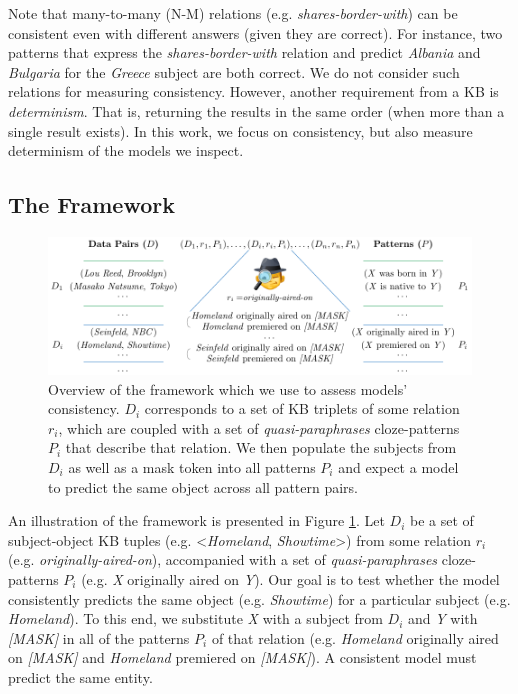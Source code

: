 Note that many-to-many (N-M) relations (e.g. \textit{shares-border-with}) can be consistent 
even with different answers (given they are correct). For instance, two patterns that express the \textit{shares-border-with} relation and predict \textit{Albania} and \textit{Bulgaria} for the \textit{Greece} subject are both correct. We do not consider such relations for measuring consistency. However, another requirement from a KB is \textit{determinism}. That is, returning the results in the same order (when more than a single result exists).
In this work, we focus on consistency, but also measure determinism of the models we inspect.

\subsection{The Framework}
\label{sec:framework}

\begin{figure}[t!]
\centering

\includegraphics[width=1.\columnwidth]{figures/framework}

\caption{Overview of the framework which we use to assess models' consistency. $D_i$ corresponds to a set of KB triplets of some relation $r_i$, which are coupled with a set of \textit{quasi-paraphrases} cloze-patterns $P_i$ that describe that relation. We then populate the subjects from $D_i$ as well as a mask token into all patterns $P_i$ and expect a model to predict the same object across all pattern pairs.}
\label{fig:framework}
\end{figure}



An illustration of the framework is presented in Figure \ref{fig:framework}.
Let $D_i$ be a set of subject-object KB tuples (e.g. <\textit{Homeland}, \textit{Showtime}>) from some relation $r_i$ (e.g. \textit{originally-aired-on}), accompanied with a set of \textit{quasi-paraphrases} cloze-patterns $P_i$ (e.g. \textit{X} originally aired on \textit{Y}).
Our goal is to test whether the model consistently predicts the same object (e.g. \textit{Showtime}) for a particular subject (e.g. \textit{Homeland}). To this end, we substitute \textit{X} with a subject from $D_i$ and \textit{Y} with \textit{[MASK]} in all of the patterns $P_i$ of that relation (e.g. \textit{Homeland} originally aired on \textit{[MASK]} and \textit{Homeland} premiered on \textit{[MASK]}).
A consistent model must predict the same entity. 


